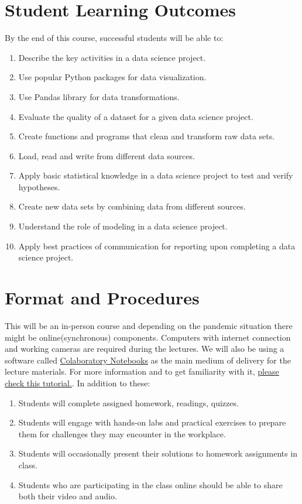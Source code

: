 \documentclass[11pt]{article}
\begin{document}
\section*{Student Learning Outcomes}

By the end of this course, successful students will be able to:
\begin{enumerate}
\item Describe the key activities in a data science project. 
\item Use popular Python packages for data visualization.
\item Use Pandas library for data transformations.
\item Evaluate the quality of a dataset for a given data science project.
\item Create functions and programs that clean and transform raw data sets.
\item Load, read and write from different data sources. 
\item Apply basic statistical knowledge in a data science project to test and verify hypotheses.
\item Create new data sets by combining data from different sources. 
\item Understand the role of modeling in a data science project.
\item Apply best practices of communication for reporting upon completing a data science project.
\end{enumerate}

\section*{Format and Procedures}

This will be an in-person course and depending on the pandemic situation there might be online(synchronous) components. Computers with internet connection and working cameras are required during the lectures. We will also be using a software called \href{https://research.google.com/colaboratory/faq.html}{Colaboratory Notebooks} as the main medium of delivery for the lecture materials. For more information and to get  familiarity with it, \href{https://colab.research.google.com/notebooks/intro.ipynb}{please check this tutorial.}. In addition to these:

\begin{enumerate}
	\item Students will complete assigned homework, readings, quizzes. 
	\item Students will engage with hands-on labs and practical exercises to prepare them for challenges they may encounter in the workplace.
	\item Students will occasionally present their solutions to homework assignments
in class.
	\item Students who are participating in the class online should be able to share both their video and audio. 
\end{enumerate}
\end{document}
